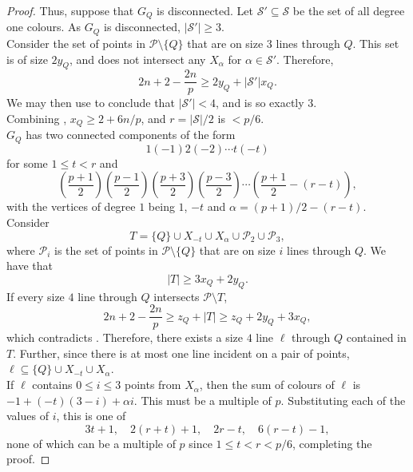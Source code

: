 \begin{proof}
		Thus, suppose that $G_Q$ is disconnected. Let $\mathcal{S}' \subseteq \mathcal{S}$ be the set of all degree one colours. As $G_Q$ is disconnected, $|\mathcal{S}'| \ge 3$.\\
		Consider the set of points in $\mathcal{P} \setminus \{Q\}$ that are on size $3$ lines through $Q$. This set is of size $2y_Q$, and does not intersect any $X_\alpha$ for $\alpha \in \mathcal{S}'$. Therefore,
		\begin{equation}
			\label{eqn: xQ yQ joint bound 2}
			2n + 2 - \frac{2n}{p} \ge 2 y_Q + |\mathcal{S}'| x_Q.
		\end{equation}
		We may then use  to conclude that $|\mathcal{S}'| < 4$, and is so exactly $3$.\\
		Combining , $x_Q \ge 2 + 6n/p$, and $r = |\mathcal{S}|/2$ is $< p/6$.\\
		$G_Q$ has two connected components of the form
		\[ 1 (-1) 2 (-2) \cdots t (-t) \]
		for some $1 \le t < r$ and
		\[ \left( \frac{p+1}{2} \right) \left( \frac{p-1}{2} \right) \left( \frac{p+3}{2} \right) \left( \frac{p-3}{2} \right) \cdots \left( \frac{p+1}{2} - (r-t) \right), \]
		with the vertices of degree $1$ being $1$, $-t$ and $\alpha = (p+1)/2 - (r-t)$. Consider
		\[ T = \{Q\} \cup X_{-t} \cup X_\alpha \cup \mathcal{P}_2 \cup \mathcal{P}_3, \]
		where $\mathcal{P}_i$ is the set of points in $\mathcal{P} \setminus \{Q\}$ that are on size $i$ lines through $Q$. We have that
		\[ |T| \ge 3x_Q + 2y_Q. \]
		If every size $4$ line through $Q$ intersects $\mathcal{P} \setminus T$,
		\[ 2n + 2 - \frac{2n}{p} \ge z_Q + |T| \ge z_Q + 2y_Q + 3x_Q, \]
		which contradicts . Therefore, there exists a size $4$ line $\ell$ through $Q$ contained in $T$. Further, since there is at most one line incident on a pair of points, $\ell \subseteq \{Q\} \cup X_{-t} \cup X_\alpha$.\\
		If $\ell$ contains $0 \le i \le 3$ points from $X_\alpha$, then the sum of colours of $\ell$ is $-1 + (-t)(3-i) + \alpha i$. This must be a multiple of $p$. Substituting each of the values of $i$, this is one of
		\[ 3t+1,\quad 2(r+t)+1,\quad 2r-t,\quad 6(r-t)-1, \]
		none of which can be a multiple of $p$ since $1 \le t < r < p/6$, completing the proof.
	\end{proof}

